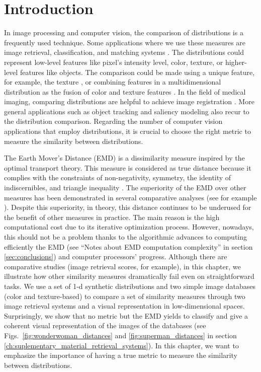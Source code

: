 \section{Introduction}\label{sec:introduction}
In image processing and computer vision, the comparison of distributions is a frequently used technique. Some applications where we use these measures are image retrieval, classification, and matching systems \citep{Smeulders.Worring.ea:PAMI:2000}. The distributions could represent low-level features like pixel's intensity level, color, texture, or higher-level features like objects. The comparison could be made using a unique feature, for example, the texture \citep{Banerjee.Bhunia.ea:ESWA:2018, Kwitt.Uhl:ICIP:2008}, or combining features in a multidimensional distribution as the fusion of color and texture features \citep{Liu.Guo.ea:IS:2017}. In the field of medical imaging, comparing distributions are helpful to achieve image registration \citep{So.Chung:JPR:2017}. More general applications such as object tracking \citep{Nejhum.Ho.ea:CVPR:2008, Klein.Frintrop:CV:2011} and  saliency modeling \citep{Bylinskii.Judd.ea:PAMI:2018} also recur to the distribution comparison. Regarding the number of computer vision applications that employ distributions, it is crucial to choose the right metric to measure the similarity between distributions.

The Earth Mover's Distance (EMD) \citep{Rubner.Tomasi.ea:IJCV:2000} is a dissimilarity measure inspired by the optimal transport theory. This measure is considered as true distance because it complies with the constraints of non-negativity, symmetry, the identity of indiscernibles, and triangle inequality \citep{Peyre.Cuturi:arXiv:2018}. The superiority of the EMD over other measures has been demonstrated in several comparative analyses (see for example \citep{Puzicha.Buhmann.ea:ICCV:1999, Rubner.Tomasi.ea:IJCV:2000}).  Despite this superiority, in theory, this distance continues to be underused for the benefit of other measures in practice. The main reason is the high computational cost due to its iterative optimization process. However, nowadays, this should not be a problem thanks to the algorithmic advances to computing efficiently the EMD (see ``Notes about EMD computation complexity'' in section \ref{sec:conclusions}) and computer processors' progress. Although there are comparative studies (image retrieval scores, for example), in this chapter, we illustrate how other similarity measures dramatically fail even on straightforward tasks. We use a set of 1-d synthetic distributions and two simple image databases (color and texture-based) to compare a set of similarity measures through two image retrieval systems and a visual representation in low-dimensional spaces. Surprisingly, we show that no metric but the EMD yields to classify and give a coherent visual representation of the images of the databases (see Figs.\ \ref{fig:wonderwoman_distances} and \ref{fig:superman_distances} in section \ref{ch:suplementary_material_retrieval_systems}). In this chapter, we want to emphasize the importance of having a true metric to measure the similarity between distributions.

